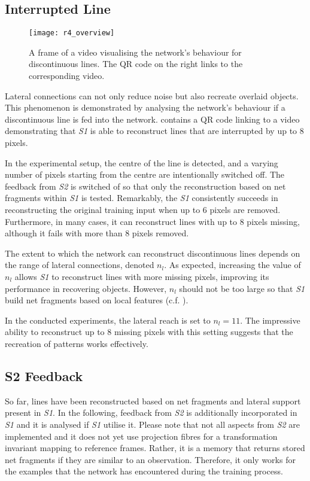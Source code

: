 \subsection{Interrupted Line}
%
\begin{figure}[h]
    \centering
    \texttt{[image: r4\_overview]}
    \caption[Video visualising the network's behaviour for discontinuous lines]{A frame of a video visualising the network's behaviour for discontinuous lines. The QR code on the right links to the corresponding video.}
\end{figure}
%
Lateral connections can not only reduce noise but also recreate overlaid objects.
This phenomenon is demonstrated by analysing the network's behaviour if a discontinuous line is fed into the network.
 contains a QR code linking to a video demonstrating that \emph{S1} is able to reconstruct lines that are interrupted by up to $8$ pixels.

In the experimental setup, the centre of the line is detected, and a varying number of pixels starting from the centre are intentionally switched off.
The feedback from \emph{S2} is switched of so that only the reconstruction based on net fragments within \emph{S1} is tested.
Remarkably, the \emph{S1} consistently succeeds in reconstructing the original training input when up to $6$ pixels are removed. Furthermore, in many cases, it can reconstruct lines with up to $8$ pixels missing, although it fails with more than $8$ pixels removed.

The extent to which the network can reconstruct discontinuous lines depends on the range of lateral connections, denoted $n_l$. As expected, increasing the value of $n_l$ allows \emph{S1} to reconstruct lines with more missing pixels, improving its performance in recovering objects.
However, $n_l$ should not be too large so that \emph{S1} build net fragments based on local features (c.f. ).

In the conducted experiments, the lateral reach is set to $n_l=11$.
The impressive ability to reconstruct up to $8$ missing pixels with this setting suggests that the recreation of patterns works effectively.


\subsection{S2 Feedback}
So far, lines have been reconstructed based on net fragments and lateral support present in \emph{S1}.
In the following, feedback from \emph{S2} is additionally incorporated in \emph{S1} and it is analysed if \emph{S1} utilise it.
Please note that not all aspects from \emph{S2} are implemented and it does not yet use projection fibres for a transformation invariant mapping to reference frames.
Rather, it is a memory that returns stored net fragments if they are similar to an observation.
Therefore, it only works for the examples that the network has encountered during the training process.

